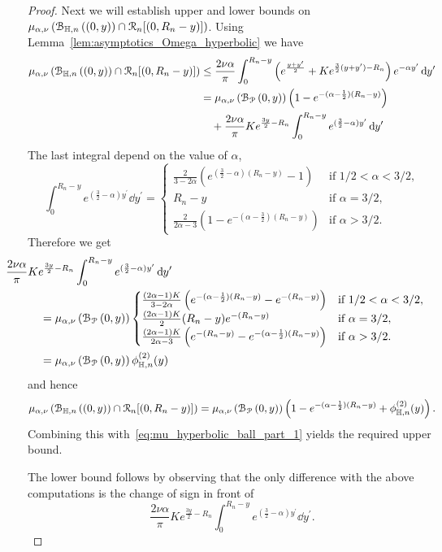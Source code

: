 \begin{proof}
Next we will establish upper and lower bounds on $\mu_{\alpha,\nu}\left({\mathcal B}_{\mathbb{H},n}\left((0,y)\right) \cap{\mathcal R}_n[(0,R_n-y)]\right)$. Using Lemma~\ref{lem:asymptotics_Omega_hyperbolic} we have 
\begin{align*}
	\mu_{\alpha,\nu}\left({\mathcal B}_{\mathbb{H},n}\left((0,y)\right) \cap{\mathcal R}_n[(0,R_n-y)]\right) 
	&\le \frac{2\nu \alpha}{\pi} \int_{0}^{R_n - y} \left(e^{\frac{y + y^\prime}{2}} + K e^{\frac{3}{2}(y + y^\prime) - R_n}\right)
		e^{-\alpha y^\prime} \operatorname{\mathrm{d}\hspace{-2pt}} y^\prime\\
	&= \mu_{\alpha,\nu}\left({\mathcal B}_{{\mathcal P}}\left(0,y\right)\right)\left(1 - e^{-(\alpha - \frac{1}{2})(R_n - y)}\right) \\
	&\hspace{10pt}+ \frac{2\nu \alpha}{\pi} K e^{\frac{3 y}{2} - R_n}\int_0^{R_n-y} e^{(\frac{3}{2} - \alpha)y^\prime} \operatorname{\mathrm{d}\hspace{-2pt}} y^\prime
\end{align*}
The last integral depend on the value of $\alpha$,
\[
	\int_0^{R_n-y} e^{(\frac{3}{2} - \alpha)y^\prime} \dd y^\prime
	= \begin{cases}
		\frac{2}{3 - 2\alpha}\left(e^{(\frac{3}{2} - \alpha)(R_n - y)} - 1\right) &\mbox{if } 1/2 < \alpha < 3/2,\\
		R_n - y &\mbox{if } \alpha = 3/2,\\
		\frac{2}{2\alpha-3}\left(1 - e^{-(\alpha - \frac{3}{2})(R_n - y)}\right) &\mbox{if } \alpha > 3/2.
	\end{cases}
\]
Therefore we get
\begin{align*}
	&\hspace{-30pt}\frac{2\nu \alpha}{\pi} K e^{\frac{3 y}{2} - R_n}
		\int_0^{R_n-y} e^{(\frac{3}{2} - \alpha)y^\prime} \dd y^\prime\\
	&= \Mu{\BallPo{0,y}}\begin{cases}
		\frac{(2\alpha - 1)K}{3 - 2\alpha}\left(e^{-(\alpha - \frac{1}{2})(R_n - y)} - e^{-(R_n - y)}\right)
		&\mbox{if } 1/2 < \alpha < 3/2,\\
		\frac{(2\alpha -1)K}{2} (R_n - y)e^{-(R_n - y)} &\mbox{if } \alpha = 3/2,\\
		\frac{(2\alpha - 1)K}{2\alpha - 3} \left(e^{-(R_n - y)} - e^{-(\alpha - \frac{1}{2})(R_n - y)}\right)
		&\mbox{if } \alpha > 3/2.
	\end{cases}\\
	&= \Mu{\BallPo{0,y}} \phi_{\H,n}^{(2)}(y)
\end{align*}
and hence
\[
	\mu_{\alpha,\nu}\left({\mathcal B}_{\mathbb{H},n}\left((0,y)\right) \cap{\mathcal R}_n[(0,R_n-y)]\right) = \mu_{\alpha,\nu}\left({\mathcal B}_{{\mathcal P}}\left(0,y\right)\right)\left(1 - e^{-(\alpha - \frac{1}{2})(R_n - y)} 
	+ \phi_{\mathbb{H},n}^{(2)}(y)\right).
\]
Combining this with~\eqref{eq:mu_hyperbolic_ball_part_1} yields the required upper bound.

The lower bound follows by observing that the only difference with the above computations is the change of sign in front of 
\[
	\frac{2 \nu \alpha}{\pi} K e^{\frac{3 y}{2} - R_n}\int_0^{R_n-y} e^{(\frac{3}{2} - \alpha)y^\prime} \dd y^\prime.
\]
\end{proof}

